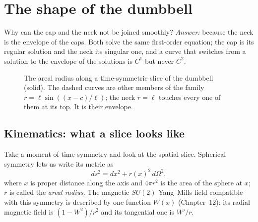 \chapter{The shape of the dumbbell}\label{ch:shape}

\begin{questionbox}
Why can the cap and the neck not be joined smoothly?
\emph{Answer:} because the neck is the envelope of the caps. Both solve the same first-order equation; the cap is its regular solution and the neck its singular one, and a curve that switches from a solution to the envelope of the solutions is $C^1$ but never $C^2$.
\end{questionbox}

\begin{figure}[h]
\centering
{}
\caption{The areal radius along a time-symmetric slice of the dumbbell (solid). The dashed curves are other members of the family $r=\ell\sin((x-c)/\ell)$; the neck $r=\ell$ touches every one of them at its top. It is their envelope.}
\label{fig:envelope}
\end{figure}

\section{Kinematics: what a slice looks like}

Take a moment of time symmetry and look at the spatial slice. Spherical symmetry lets us write its metric as
\begin{equation}\label{eq:slice}
ds^2 = dx^2 + r(x)^2\,d\Omega^2 ,
\end{equation}
where $x$ is proper distance along the axis and $4\pi r^2$ is the area of the sphere at $x$; $r$ is called the \emph{areal radius}.
The magnetic $SU(2)$ Yang--Mills field compatible with this symmetry is described by one function $W(x)$ (Chapter~12): its radial magnetic field is $(1-W^2)/r^2$ and its tangential one is $W'/r$.

